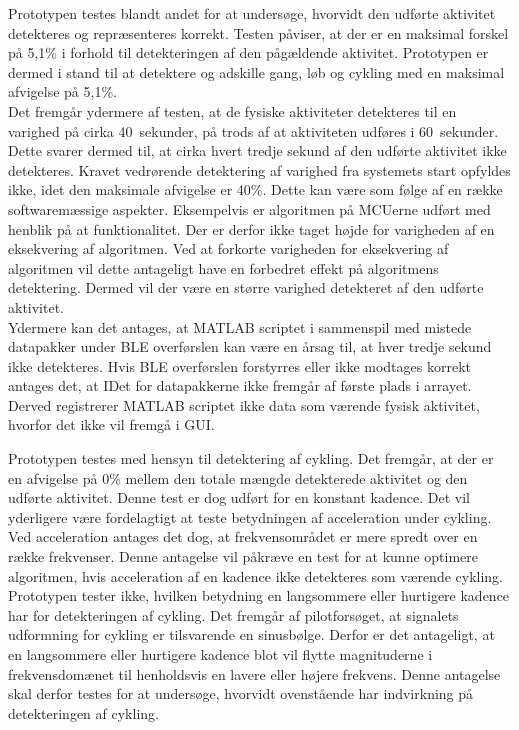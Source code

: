 Prototypen testes blandt andet for at undersøge, hvorvidt den udførte aktivitet detekteres og repræsenteres korrekt. Testen påviser, at der er en maksimal forskel på 5,1\% i forhold til detekteringen af den pågældende aktivitet. Prototypen er dermed i stand til at detektere og adskille gang, løb og cykling med en maksimal afvigelse på 5,1\%. \\
Det fremgår ydermere af testen, at de fysiske aktiviteter detekteres til en varighed på cirka 40~sekunder, på trods af at aktiviteten udføres i 60~sekunder. Dette svarer dermed til, at cirka hvert tredje sekund af den udførte aktivitet ikke detekteres. Kravet vedrørende detektering af varighed fra systemets start opfyldes ikke, idet den maksimale afvigelse er 40\%. Dette kan være som følge af en række softwaremæssige aspekter. Eksempelvis er algoritmen på MCUerne udført med henblik på at funktionalitet. Der er derfor ikke taget højde for varigheden af en eksekvering af algoritmen. Ved at forkorte varigheden for eksekvering af algoritmen vil dette antageligt have en forbedret effekt på algoritmens detektering. Dermed vil der være en større varighed detekteret af den udførte aktivitet. \\
Ydermere kan det antages, at MATLAB scriptet i sammenspil med mistede datapakker under BLE overførslen kan være en årsag til, at hver tredje sekund ikke detekteres. Hvis BLE overførslen forstyrres eller ikke modtages korrekt antages det, at IDet for datapakkerne ikke fremgår af første plads i arrayet. Derved registrerer MATLAB scriptet ikke data som værende fysisk aktivitet, hvorfor det ikke vil fremgå i GUI. 

Prototypen testes med hensyn til detektering af cykling. Det fremgår, at der er en afvigelse på 0\% mellem den totale mængde detekterede aktivitet og den udførte aktivitet. Denne test er dog udført for en konstant kadence. Det vil yderligere være fordelagtigt at teste betydningen af acceleration under cykling. Ved acceleration antages det dog, at frekvensområdet er mere spredt over en række frekvenser. Denne antagelse vil påkræve en test for at kunne optimere algoritmen, hvis acceleration af en kadence ikke detekteres som værende cykling. \\
Prototypen tester ikke, hvilken betydning en langsommere eller hurtigere kadence har for detekteringen af cykling. Det fremgår af pilotforsøget, at signalets udformning for cykling er tilsvarende en sinusbølge. Derfor er det antageligt, at en langsommere eller hurtigere kadence blot vil flytte magnituderne i frekvensdomænet til henholdsvis en lavere eller højere frekvens. Denne antagelse skal derfor testes for at undersøge, hvorvidt ovenstående har indvirkning på detekteringen af cykling.

